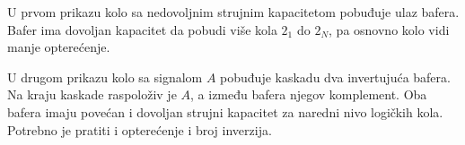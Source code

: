 U prvom prikazu kolo sa nedovoljnim strujnim kapacitetom pobuđuje ulaz bafera. Bafer ima dovoljan kapacitet da pobudi više kola $2_1$ do $2_N$, pa osnovno kolo vidi manje opterećenje.

U drugom prikazu kolo sa signalom $A$ pobuđuje kaskadu dva invertujuća bafera. Na kraju kaskade raspoloživ je $A$, a između bafera njegov komplement. Oba bafera imaju povećan i dovoljan strujni kapacitet za naredni nivo logičkih kola. Potrebno je pratiti i opterećenje i broj inverzija.
